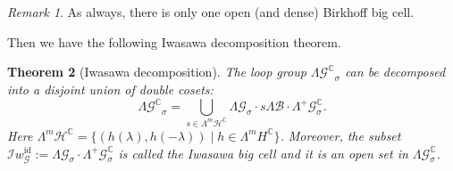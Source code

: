 \documentclass[12pt]{amsart}
\newtheorem{Theorem}{Theorem}[section]
\theoremstyle{definition}
\theoremstyle{remark}
\newtheorem{Remark}[Theorem]{Remark}
\numberwithin{equation}{section}
\begin{document}
\begin{Remark}
As always, there is only one open (and dense) Birkhoff big cell.
\end{Remark}
 Then we have the following Iwasawa decomposition theorem.
\begin{Theorem}[Iwasawa decomposition]\label{thm:Iwasawadouble}
 The loop group ${\Lambda {\mathcal G}^{\mathbb C}}_{\sigma}$ 
 can be decomposed into a disjoint union 
 of double cosets:
\begin{equation*}
 {\Lambda {\mathcal G}^{\mathbb C}}_{\sigma}=\bigcup_{s\in \Lambda^{m}{\mathcal H}^{\mathbb C}}
 \Lambda {\mathcal G}_{\sigma}  \cdot
 s \Lambda {\mathcal B}
 \cdot
 \Lambda^{+}{\mathcal G}^{\mathbb C}_{\sigma}.
\end{equation*}
 Here $ \Lambda^{m}{\mathcal H}^{\mathbb C} 
 = \{(h({\lambda}), h(-{\lambda}))\;|\; h \in \Lambda^m H^{\mathbb C}\}$.
 Moreover,  the subset
 $\mathcal Iw_{\mathcal G}^{\operatorname{id}}:= \Lambda{\mathcal G}_{\sigma}\cdot \Lambda^{+}{\mathcal G}^{\mathbb C}_{\sigma}$ 
 is called the 
{\rm Iwasawa big cell} and it
 is an open set in $\Lambda{\mathcal G}^{\mathbb C}_{\sigma}$. 
\end{Theorem}
\end{document}
